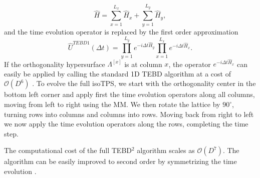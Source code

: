 \begin{equation}
	\hat{H} = \sum_{x = 1}^{L_x} \hat{H}_x + \sum_{y = 1}^{L_y} \hat{H}_y,
\end{equation}
and the time evolution operator is replaced by the first order approximation
\begin{equation}
	\hat{U}^{TEBD1}(\Delta t) = \prod_{y=1}^{L_y} e^{-i\Delta t\hat{H}_y} \prod_{x=1}^{L_x} e^{-i\Delta t\hat{H}_x} .
\end{equation}
If the orthogonality hypersurface $\Lambda^{[x]}$ is at column $x$, the operator $e^{-i\Delta t\hat{H}_x}$ can easily be applied by calling the standard 1D TEBD algorithm at a cost of $\mathcal{O}(D^6)$ \cite{cite:isometric_tensor_network_states_in_two_dimensions}. To evolve the full isoTPS, we start with the orthogonality center in the bottom left corner and apply first the time evolution operators along all columns, moving from left to right using the MM. We then rotate the lattice by $90^\circ$, turning rows into columns and columns into rows. Moving back from right to left we now apply the time evolution operators along the rows, completing the time step. \par
The computational cost of the full TEBD$^2$ algorithm scales as $\mathcal{O}(D^7)$. The algorithm can be easily improved to second order by symmetrizing the time evolution \cite{cite:efficient_simulation_of_dynamics_in_two_dimensional_quantum_spin_systems}.